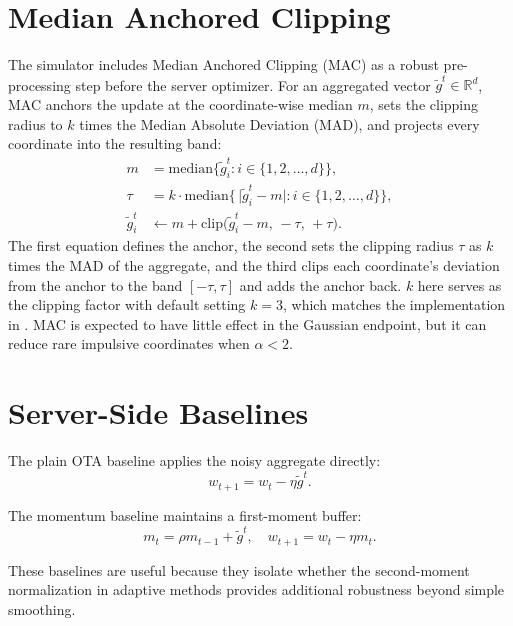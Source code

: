 \section{Median Anchored Clipping}
The simulator includes Median Anchored Clipping (MAC) as a robust
pre-processing step before the server optimizer. For an aggregated vector
$\tilde{g}^t\in\mathbb{R}^d$, MAC anchors the update at the coordinate-wise
median $m$, sets the clipping radius to $k$ times the Median Absolute
Deviation (MAD), and projects every coordinate into the resulting band:
\begin{align}
    m   &= \mathrm{median}\bigl\{\tilde{g}_i^t : i\in\{1,2,\dots,d\}\bigr\}, \\
    \tau &= k\cdot \mathrm{median}\bigl\{\,\lvert\tilde{g}_i^t-m\rvert : i\in\{1,2,\dots,d\}\bigr\}, \\
    \tilde{g}_i^t &\leftarrow m + \mathrm{clip}\bigl(\tilde{g}_i^t-m,\,-\tau,\,+\tau\bigr).
\end{align}
The first equation defines the anchor, the second sets the clipping radius
$\tau$ as $k$ times the MAD of the aggregate, and the third clips each
coordinate's deviation from the anchor to the band $[-\tau,\tau]$ and adds
the anchor back. $k$ here serves as the clipping factor with default setting $k=3$,
which matches the implementation in . MAC is
expected to have little effect in the Gaussian endpoint, but it can reduce
rare impulsive coordinates when $\alpha<2$.

\section{Server-Side Baselines}
The plain OTA baseline applies the noisy aggregate directly:
\begin{equation}
    w_{t+1} = w_t - \eta \tilde{g}^t.
\end{equation}

The momentum baseline maintains a first-moment buffer:
\begin{equation}
    m_t = \rho m_{t-1} + \tilde{g}^t,
    \quad
    w_{t+1} = w_t - \eta m_t.
\end{equation}

These baselines are useful because they isolate whether the second-moment
normalization in adaptive methods provides additional robustness beyond
simple smoothing.

